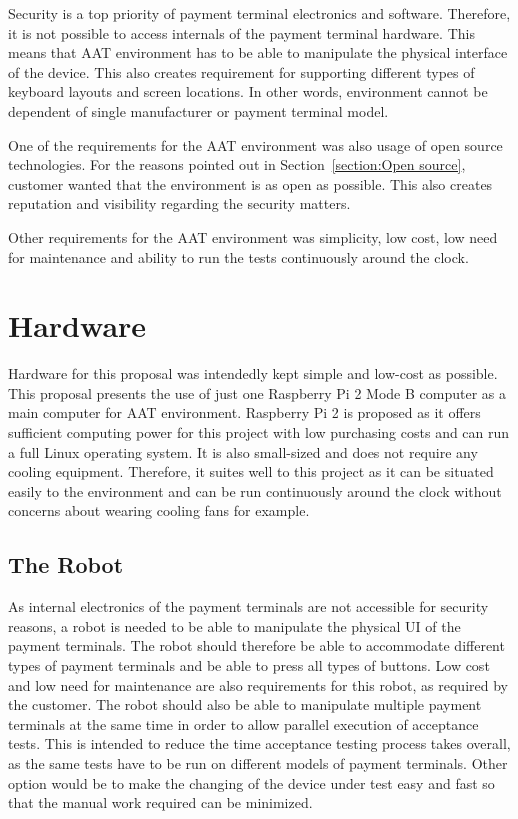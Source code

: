 Security is a top priority of payment terminal electronics and software. Therefore, it is not possible to access internals of the payment terminal hardware. This means that AAT environment has to be able to manipulate the physical interface of the device. This also creates requirement for supporting different types of keyboard layouts and screen locations. In other words, environment cannot be dependent of single manufacturer or payment terminal model.

One of the requirements for the AAT environment was also usage of open source technologies. For the reasons pointed out in Section~\ref{section:Open source}, customer wanted that the environment is as open as possible. This also creates reputation and visibility regarding the security matters.

Other requirements for the AAT environment was simplicity, low cost, low need for maintenance and ability to run the tests continuously around the clock.

\section{Hardware}
\label{section:Proposed hardware}

Hardware for this proposal was intendedly kept simple and low-cost as possible. This proposal presents the use of just one Raspberry Pi 2 Mode B \citep{raspberry} computer as a main computer for AAT environment. Raspberry Pi 2 is proposed as it offers sufficient computing power for this project with low purchasing costs and can run a full Linux operating system. It is also small-sized and does not require any cooling equipment. Therefore, it suites well to this project as it can be situated easily to the environment and can be run continuously around the clock without concerns about wearing cooling fans for example.

\FloatBarrier
\subsection{The Robot}
\label{subsection:The Robot proposal}

As internal electronics of the payment terminals are not accessible for security reasons, a robot is needed to be able to manipulate the physical UI of the payment terminals. The robot should therefore be able to accommodate different types of payment terminals and be able to press all types of buttons. Low cost and low need for maintenance are also requirements for this robot, as required by the customer. The robot should also be able to manipulate multiple payment terminals at the same time in order to allow parallel execution of acceptance tests. This is intended to reduce the time acceptance testing process takes overall, as the same tests have to be run on different models of payment terminals. Other option would be to make the changing of the device under test easy and fast so that the manual work required can be minimized.

